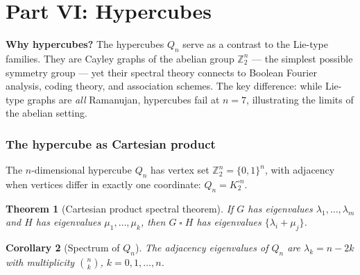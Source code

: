 \documentclass[11pt,a4paper]{article}
\theoremstyle{plain}
\newtheorem{theorem}{Theorem}[section]
\newtheorem{corollary}[theorem]{Corollary}
\theoremstyle{definition}
\theoremstyle{remark}
\newcommand{\Z}{\mathbb{Z}}
\begin{document}
%
%

\newpage
\part*{Part VI: Hypercubes}

\begin{tcolorbox}[colback=yellow!10, colframe=yellow!10,
  boxrule=0pt, sharp corners]
\textbf{Why hypercubes?}
The hypercubes $Q_n$ serve as a contrast to the Lie-type families.
They are Cayley graphs of the abelian group $\Z_2^n$ --- the simplest
possible symmetry group --- yet their spectral theory connects to Boolean
Fourier analysis, coding theory, and association schemes.
The key difference: while Lie-type graphs are \emph{all} Ramanujan,
hypercubes fail at $n = 7$, illustrating the limits of the abelian setting.
\end{tcolorbox}


\section{The hypercube as Cartesian product}

The $n$-dimensional hypercube $Q_n$ has vertex set $\Z_2^n = \{0,1\}^n$,
with adjacency when vertices differ in exactly one coordinate:
$Q_n = K_2^{\square n}$.

\begin{tcolorbox}[colback=black!5, colframe=black!5,
  boxrule=0pt, sharp corners]
\begin{theorem}[Cartesian product spectral theorem]
\label{thm:cart-spec}
If $G$ has eigenvalues $\lambda_1, \ldots, \lambda_m$ and $H$ has
eigenvalues $\mu_1, \ldots, \mu_k$, then $G \mathbin{\square} H$ has
eigenvalues $\{\lambda_i + \mu_j\}$.
\end{theorem}

\begin{corollary}[Spectrum of $Q_n$]
\label{cor:hypercube-spec}
The adjacency eigenvalues of $Q_n$ are
$\lambda_k = n - 2k$ with multiplicity $\binom{n}{k}$, $k = 0, 1, \ldots, n$.
\end{corollary}
\end{tcolorbox}
\end{document}

